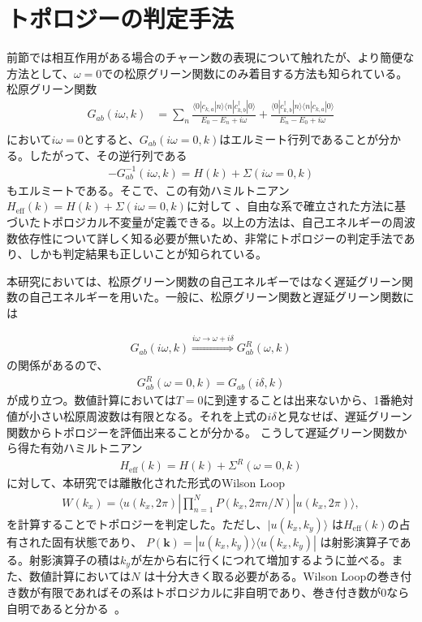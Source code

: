 \documentclass[12pt]{jsbook}
\newcommand{\la}{\langle}
\newcommand{\ra}{\rangle}
\newcommand{\ca}{c_{k,a}}
\newcommand{\cbd}{c_{k,b}^{\dagger}}
\newcommand{\bk}{\bm{k}}
\begin{document}
\section{トポロジーの判定手法}%
前節では相互作用がある場合のチャーン数の表現について触れたが、より簡便な方法として、$\omega=0$での松原グリーン関数にのみ着目する方法も知られている\cite{PhysRevX.2.031008,article}。松原グリーン関数
\begin{eqnarray}
     G_{ab}(i\omega,k) &= \displaystyle \sum_n \frac{\la 0|\ca |n\ra \la n| \cbd | 0\ra}{E_0-E_n + i\omega  } + \frac{\la 0|\cbd |n\ra \la n| \ca |0\ra}{E_n - E_0 + i\omega}\\
\end{eqnarray}
において$i\omega=0$とすると、$G_{ab}(i\omega=0,k)$はエルミート行列であることが分かる。したがって、その逆行列である
\begin{eqnarray}
    -G^{-1}_{ab}(i\omega,k)=H(k) + \Sigma(i\omega=0,k)
\end{eqnarray}
もエルミートである。そこで、この有効ハミルトニアン$H_{\mathrm{eff}}(k) = H(k) + \Sigma(i\omega=0,k)$に対して
、自由な系で確立された方法に基づいたトポロジカル不変量が定義できる。以上の方法は、自己エネルギーの周波数依存性について詳しく知る必要が無いため、非常にトポロジーの判定手法であり、しかも判定結果も正しいことが知られている。

本研究においては、松原グリーン関数の自己エネルギーではなく遅延グリーン関数の自己エネルギーを用いた。一般に、松原グリーン関数と遅延グリーン関数には

\begin{eqnarray}
    G_{ab}(i\omega,k) \overset{i\omega\to \omega+i\delta}{\Longrightarrow}G^{R}_{ab}(\omega,k)
\end{eqnarray}
の関係があるので、
\begin{eqnarray}
    G^{R}_{ab}(\omega=0,k)=G_{ab}(i\delta,k)
\end{eqnarray}
が成り立つ。数値計算においては$T=0$に到達することは出来ないから、1番絶対値が小さい松原周波数は有限となる。それを上式の$i\delta$と見なせば、遅延グリーン関数からトポロジーを評価出来ることが分かる。
こうして遅延グリーン関数から得た有効ハミルトニアン
\begin{eqnarray}
    H_{\mathrm{eff}}(k) = H(k) + \Sigma^{R}(\omega=0,k)
\end{eqnarray}
に対して、本研究では離散化された形式のWilson Loop\cite{asboth2016short,PhysRevB.99.045140,PhysRevB.100.195135}
\begin{eqnarray}
W(k_x) =\langle u(k_x,2\pi)| \displaystyle \prod_{n=1}^{N}P(k_x,2\pi n/N) |u(k_x, 2\pi)\rangle,
\end{eqnarray}
を計算することでトポロジーを判定した。ただし、$|u(k_x,k_y)\rangle$ は$H_{\mathrm{eff}}(k)$の占有された固有状態であり、 $P(\bk)=|u(k_x,k_y)\rangle\langle u(k_x,k_y)|$ は射影演算子である。射影演算子の積は$k_y$が左から右に行くにつれて増加するように並べる。また、数値計算においては$N$ は十分大きく取る必要がある。Wilson Loopの巻き付き数が有限であればその系はトポロジカルに非自明であり、巻き付き数が$0$なら自明であると分かる~\cite{asboth2016short,PhysRevB.99.045140,PhysRevB.100.195135}。
\end{document}
